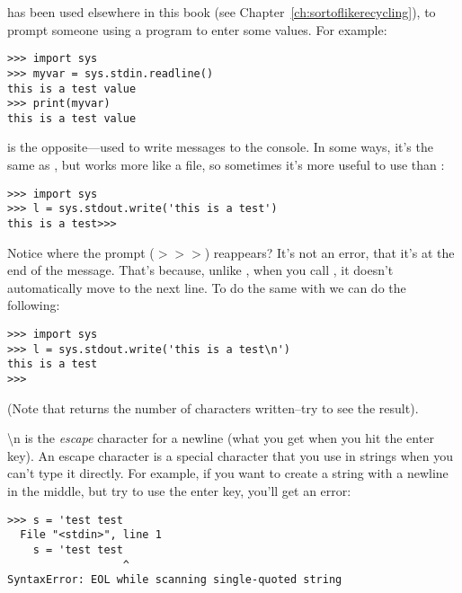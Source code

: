  has been used elsewhere in this book (see Chapter~\ref{ch:sortoflikerecycling}), to prompt someone using a program to enter some values. For example:

\begin{listingignore}
\begin{verbatim}
>>> import sys
>>> myvar = sys.stdin.readline()
this is a test value
>>> print(myvar)
this is a test value
\end{verbatim}
\end{listingignore}

 is the opposite---used to write messages to the console. In some ways, it's the same as , but works more like a file, so sometimes it's more useful to use  than :

\begin{listingignore}
\begin{verbatim}
>>> import sys
>>> l = sys.stdout.write('this is a test')
this is a test>>>
\end{verbatim}
\end{listingignore}

Notice where the prompt ($>>>$) reappears?  It's not an error, that it's at the end of the message.  That's because, unlike , when you call , it doesn't automatically move to the next line. To do the same with  we can do the following:

\begin{listingignore}
\begin{verbatim}
>>> import sys
>>> l = sys.stdout.write('this is a test\n')
this is a test
>>>
\end{verbatim}
\end{listingignore}

\noindent
(Note that  returns the number of characters written--try  to see the result).

\noindent
{\textbackslash}n is the \emph{escape} character for a newline (what you get when you hit the enter key).  An escape character is a special character that you use in strings when you can't type it directly. For example, if you want to create a string with a newline in the middle, but try to use the enter key, you'll get an error:

\begin{listing}
\begin{verbatim}
>>> s = 'test test 
  File "<stdin>", line 1
    s = 'test test 
                  ^
SyntaxError: EOL while scanning single-quoted string
\end{verbatim}
\end{listing}

